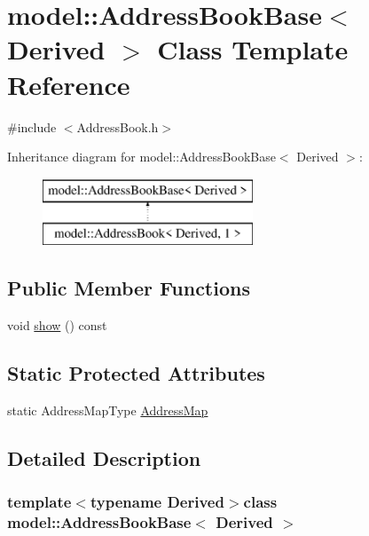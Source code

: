 \hypertarget{classmodel_1_1_address_book_base}{}\section{model\+:\+:Address\+Book\+Base$<$ Derived $>$ Class Template Reference}
\label{classmodel_1_1_address_book_base}


{\ttfamily \#include $<$Address\+Book.\+h$>$}

Inheritance diagram for model\+:\+:Address\+Book\+Base$<$ Derived $>$\+:\begin{figure}[H]
\begin{center}
\leavevmode
\includegraphics[height=2.000000cm]{classmodel_1_1_address_book_base}
\end{center}
\end{figure}
\subsection*{Public Member Functions}
\begin{DoxyCompactItemize}
\item 
void \hyperlink{classmodel_1_1_address_book_base_a22f86025c3379002c15277cb1cfd2158}{show} () const 
\end{DoxyCompactItemize}
\subsection*{Static Protected Attributes}
\begin{DoxyCompactItemize}
\item 
static Address\+Map\+Type \hyperlink{classmodel_1_1_address_book_base_add26dd096aee0f90f2a8099f90ba649f}{Address\+Map}
\end{DoxyCompactItemize}


\subsection{Detailed Description}
\subsubsection*{template$<$typename Derived$>$class model\+::\+Address\+Book\+Base$<$ Derived $>$}



